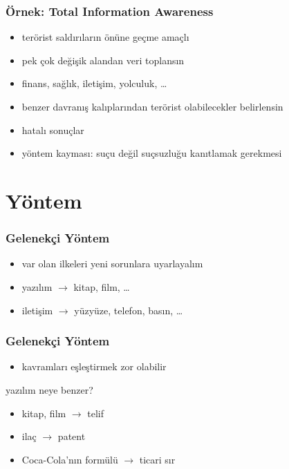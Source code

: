 \documentclass[dvipsnames]{beamer}
\theoremstyle{plain}
\begin{document}
\begin{frame}
  \frametitle{Örnek: Total Information Awareness}

  \begin{itemize}
    \item terörist saldırıların önüne geçme amaçlı

    \medskip
    \item pek çok değişik alandan veri toplansın
    \item finans, sağlık, iletişim, yolculuk, \ldots
    \item benzer davranış kalıplarından terörist olabilecekler belirlensin

    \bigskip
    \item hatalı sonuçlar
    \item yöntem kayması: suçu değil suçsuzluğu kanıtlamak gerekmesi
  \end{itemize}
\end{frame}

\section{Yöntem}

\begin{frame}
  \frametitle{Gelenekçi Yöntem}

  \begin{itemize}
    \item var olan ilkeleri yeni sorunlara uyarlayalım

    \bigskip
    \item yazılım $\rightarrow$ kitap, film, \ldots
    \item iletişim $\rightarrow$ yüzyüze, telefon, basın, \ldots
  \end{itemize}
\end{frame}

\begin{frame}
  \frametitle{Gelenekçi Yöntem}

  \begin{itemize}
    \item kavramları eşleştirmek zor olabilir
  \end{itemize}

  \begin{exampleblock}{yazılım neye benzer?}
    \begin{itemize}
      \item kitap, film $\rightarrow$ telif
      \item ilaç $\rightarrow$ patent
      \item Coca-Cola'nın formülü $\rightarrow$ ticari sır
    \end{itemize}
  \end{exampleblock}
\end{frame}
\end{document}
